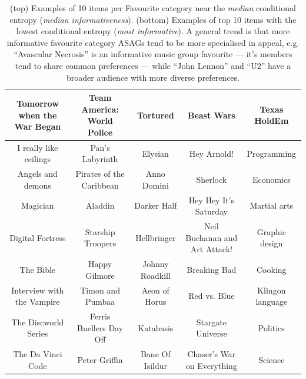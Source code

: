 \begin{table}[t!]
{\begin{tabular}{|c|c|c|c|c|}
\hline
Tomorrow when the War Began & Team America: World Police & Tortured & Beast Wars & Texas HoldEm \\
\hline
I really like ceilings  & Pan's Labyrinth & Elysian & Hey Arnold! & Programming\\
\hline
Angels and demons  & Pirates of the Caribbean & Anno Domini & Sherlock & Economics\\
\hline
Magician  & Aladdin & Darker Half & Hey Hey It's Saturday & Martial arts\\
\hline
Digital Fortress  & Starship Troopers & Hellbringer & Neil Buchanan and Art Attack! & Graphic design\\
\hline
The Bible  & Happy Gilmore & Johnny Roadkill & Breaking Bad & Cooking\\
\hline
Interview with the Vampire  & Timon and Pumbaa & Aeon of Horus & Red vs. Blue & Klingon language\\
\hline
The Discworld Series  & Ferris Buellers Day Off & Katabasis & Stargate Universe & Politics\\
\hline
The Da Vinci Code  & Peter Griffin & Bane Of Isildur & Chaser's War on Everything & Science\\
\hline
\end{tabular}}
\caption{(top) Examples of 10 items per Favourite category near the \emph{median} conditional entropy (\emph{median informativeness}).
(bottom) Examples of top 10 items with the lowest conditional entropy (\emph{most informative}).
A general trend is that more informative favourite category ASAGs tend to be more specialised in
appeal, e.g. ``Avascular Necrosis'' is an informative music group favourite --- it's members
tend to share common preferences --- while ``John Lennon'' and ``U2'' have a broader audience with
more diverse preferences.}
\label{table:fav_examples}
\end{table}


